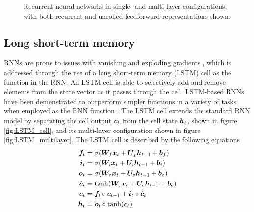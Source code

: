 \begin{figure}[htbp]
	\centering
	\quad\quad
	\caption{Recurrent neural networks in single- and multi-layer configurations, with both recurrent and unrolled feedforward representations shown. }
	\label{fig:rnn}
\end{figure}


\subsection{Long short-term memory}
RNNs are prone to issues with vanishing and exploding gradients \cite{Goodfellow-et-al-2016}, which is addressed through the use of a long short-term memory (LSTM) \cite{hochreiter1997long} cell as the function in the RNN.
An LSTM cell is able to selectively add and remove elements from the state vector as it passes through the cell.
LSTM-based RNNs have been demonstrated to outperform simpler functions in a variety of tasks when employed as the RNN function \cite{Chung2014}\cite{jozefowicz2015empirical}\cite{le2015simple}.
The LSTM cell extends the standard RNN model by separating the cell output ${\bm{c}}_t$ from the cell state ${\bm{h}}_t$, shown in figure \ref{fig:LSTM_cell}, and its multi-layer configuration shown in figure \ref{fig:LSTM_multilayer}.
The LSTM cell is described by the following equations
\begin{align}
{\bm{f}}_t &= \sigma({\bm{W}}_{f} {\bm{x}}_t + {\bm{U}}_{f} {\bm{h}}_{t-1} + {\bm{b}}_f) \label{eq:forget_lstm}\\
{\bm{i}}_t &= \sigma({\bm{W}}_{i} {\bm{x}}_t + {\bm{U}}_{i} {\bm{h}}_{t-1} + {\bm{b}}_i) \\
{\bm{o}}_t &= \sigma({\bm{W}}_{o} {\bm{x}}_t + {\bm{U}}_{o} {\bm{h}}_{t-1} + {\bm{b}}_o) \\
\hat{{\bm{c}}}_t &= \text{tanh}({\bm{W}}_{c} {\bm{x}}_t + {\bm{U}}_{c} {\bm{h}}_{t-1} + {\bm{b}}_c) \\
{\bm{c}}_t &= {\bm{f}}_t \circ {\bm{c}}_{t-1} + {\bm{i}}_t \circ \hat{{\bm{c}}}_t \\
{\bm{h}}_t &= {\bm{o}}_t \circ \text{tanh}({\bm{c}}_t) \label{eq:cell_state_lstm}
\end{align}

